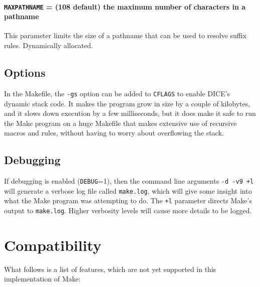 \subsubsection{{\tt MAXPATHNAME} = (108 default) the maximum number of
characters in a pathname}

This parameter limits the size of a pathname that can be used to
resolve suffix rules.  Dynamically allocated.


\section{Options}

In the Makefile, the {\tt -gs} option can be added to {\tt CFLAGS} to
enable DICE's dynamic stack code.  It makes the program grow in size by a
couple of kilobytes, and it slows down execution by a few milliseconds, but
it does make it safe to run the Make program on a huge Makefile that makes
extensive use of recursive macros and rules, without having to worry about
overflowing the stack.


\section{Debugging}

If debugging is enabled ({\tt DEBUG}=1), then the command line arguments
{\tt -d -v9 +l} will generate a verbose log file called {\tt make.log},
which will give some insight into what the Make program was attempting to
do.  The {\tt +l} parameter directs Make's output to {\tt make.log}.
Higher verbosity levels will cause more details to be logged.


\chapter{Compatibility}

What follows is a list of features, which are not yet supported in this
implementation of Make:

